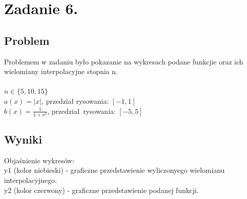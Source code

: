 \documentclass[11pt, a4paper]{article}
\begin{document}
    \section{Zadanie 6.}
    \subsection{Problem}
    Problemem w zadaniu było pokazanie na wykresach podane funkcjie oraz ich wielomiany interpolacyjne stopnia n.\\
    \\
    $n \in \{5, 10, 15\}$\\
    $a(x) = |x|$, przedział rysowania: $[-1,1]$\\
    $b(x) = \frac{1}{1 + x^2}$, przedział rysowania: $[-5, 5]$
    \subsection{Wyniki}
    Objaśnienie wykresów:\\
    y1 (kolor niebieski) - graficzne przedstawienie wyliczonyego wielomianu interpolacyjnego.\\
    y2 (kolor czerwony) - graficzne przedstawienie podanej funkcji.
\end{document}
